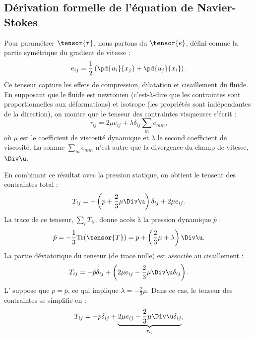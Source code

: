 \begin{redmargin}

\section{Dérivation formelle de l'équation de Navier-Stokes \label{sect:ns}}

Pour paramétrer $\tensor{\tau}$, nous partons du  $\tensor{e}$, défini comme la partie symétrique du gradient de vitesse :
\begin{displaymath}
  e_{ij} = \frac{1}{2}\left( \pd{u_i}{x_j} + \pd{u_j}{x_i} \right).
\end{displaymath}
Ce tenseur capture les effets de compression, dilatation et cisaillement du fluide. En supposant que le fluide est newtonien (c'est-à-dire que les contraintes sont proportionnelles aux déformations) et isotrope (les propriétés sont indépendantes de la direction), on montre que le tenseur des contraintes visqueuses s'écrit :
\begin{displaymath}
  \tau_{ij} = 2 \mu e_{ij} + \lambda \delta_{ij} \sum_{m} e_{mm},
\end{displaymath}
où $\mu$ est le coefficient de viscosité dynamique et $\lambda$ le second coefficient de viscosité. La somme $\sum_{m} e_{mm}$ n'est autre que la divergence du champ de vitesse, $\Div \u$.

En combinant ce résultat avec la pression statique, on obtient le tenseur des contraintes total :
\begin{equation}
  T_{ij} = - \left( p + \frac{2}{3} \mu \Div \u \right) \delta_{ij} + 2\mu e_{ij}.
  \label{eq:stress_tensor}
\end{equation}
La trace de ce tenseur, $\sum_i T_{ii}$, donne accès à la pression dynamique $\bar{p}$ :
\begin{displaymath}
  \bar{p} = -\frac{1}{3} \text{Tr}(\tensor{T}) = p + \left( \frac{2}{3}\mu + \lambda \right) \Div \u.
\end{displaymath}
La partie déviatorique du tenseur (de trace nulle) est associée au cisaillement :
\begin{displaymath}
  T_{ij} = - \bar{p} \delta_{ij} + \left( 2 \mu e_{ij} - \frac{2}{3}\mu \Div \u \delta_{ij} \right).
\end{displaymath}
L' suppose que $p = \bar{p}$, ce qui implique $\lambda = -\frac{2}{3}\mu$. Dans ce cas, le tenseur des contraintes se simplifie en :
\begin{displaymath}
  T_{ij} = - p \delta_{ij} + \underbrace{2\mu e_{ij} - \frac{2}{3}\mu \Div \u \delta_{ij}}_{\tau_{ij}}, 
\end{displaymath}


\end{redmargin}
